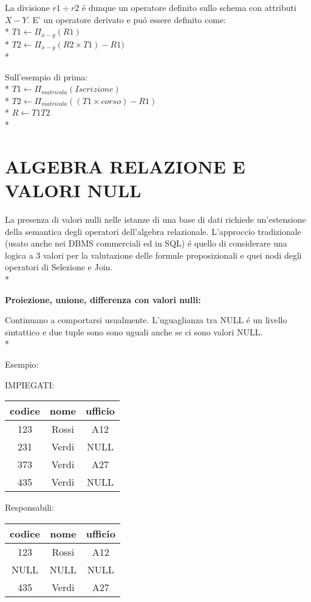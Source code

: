 \documentclass[10pt]{report}
\begin{document}
La divisione $r1 \div r2$ \'e  dunque un operatore definito sullo schema con attributi $X - Y$.
E' un operatore derivato e pu\'o essere definito come:\\*
$T1 \leftarrow \Pi _{x-y}(R1)$\\*
$T2 \leftarrow \Pi _{x-y}(R2 \times T1)-R1)$\\*

Sull'esempio di prima:\\*
$T1 \leftarrow \Pi _{\textit{matricola}}(\textit{Iscrizione})$\\*
$T2 \leftarrow \Pi _{\textit{matricola}}((T1 \times \textit{corso})-R1)$\\*
$R \leftarrow \textit{T1T2}$\\*


\section{ALGEBRA RELAZIONE E VALORI NULL}

La presenza di valori nulli nelle istanze di una base di dati richiede un'estensione della semantica degli operatori dell'algebra relazionale. L'approccio tradizionale  (usato anche nei DBMS commerciali ed in SQL) \'e quello di considerare una logica a 3 valori per la valutazione delle formule proposizionali e quei nodi degli operatori di Selezione e Join.\\*

\textbf{Proiezione, unione, differenza con valori nulli:\\}
\begin{center}
Continuano a comportarsi usualmente. L'uguaglianza tra NULL \'e un livello sintattico e due tuple sono sono uguali anche se ci sono valori NULL.\\*
\end{center}

Esempio:

IMPIEGATI:
	\begin{tabular}{|c|c|c|}
	\hline 
	codice & nome & ufficio \\ 
	\hline 
	123 & Rossi & A12 \\ 
	\hline 
	231 & Verdi & NULL \\ 
	\hline 
	373 & Verdi & A27 \\ 
	\hline 
	435 & Verdi & NULL \\ 
	\hline 
	\end{tabular} 
Responsabili:
	\begin{tabular}{|c|c|c|}
	\hline 
	codice & nome & ufficio \\ 
	\hline 
	123 & Rossi & A12 \\ 
	\hline 
	NULL & NULL & NULL \\ 
	\hline 
	435 & Verdi & A27 \\ 
	\hline 
	\end{tabular} 
\end{document}
